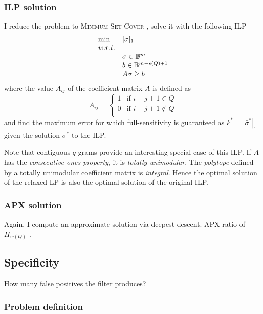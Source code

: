 \subsubsection{ILP solution}

I reduce the problem to \textsc{Minimum Set Cover} \citep{Vazirani2001}, solve it with the following ILP
\begin{equation}
\begin{array}{ll}
\text{min} & |\sigma|_1	\\
w.r.t.				\\
& \sigma \in \mathbb {B}^m	\\
& b \in \mathbb {B}^{m-s(Q)+1}\\
& A\sigma \geq b	\\
\end{array}
\end{equation}
where the value $A_{ij}$ of the coefficient matrix $A$ is defined as
\begin{equation}
A_{ij} = 
\left\{
	\begin{array}{ll}
		1  & \mbox{if } i-j+1 \in Q		\\
		0  & \mbox{if } i-j+1 \notin Q	\\
	\end{array}
\right.
\end{equation}
and find the maximum error for which full-sensitivity is guaranteed as $k^* = |\bar{\sigma}^*|_1$ given the solution $\sigma^*$ to the ILP.

Note that contiguous $q$-grams provide an interesting special case of this ILP.
If $A$ has the \emph{consecutive ones property}, it is \emph{totally unimodular}.
The \emph{polytope} defined by a totally unimodular coefficient matrix is \emph{integral}.
Hence the optimal solution of the relaxed LP is also the optimal solution of the original ILP.


\subsubsection{APX solution}

Again, I compute an approximate solution via deepest descent.
APX-ratio of $H_{w(Q)}$ \citep{Vazirani2001}.


\subsection{Specificity}

How many false positives the filter produces?

\subsubsection{Problem definition}

